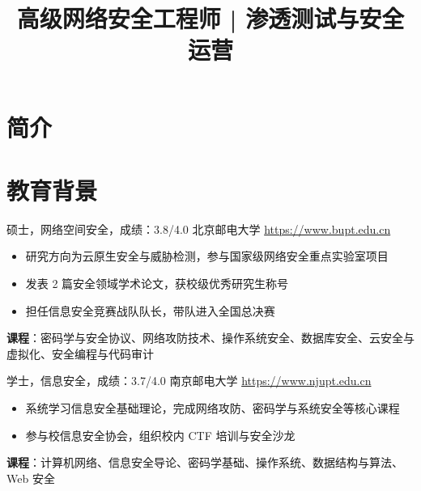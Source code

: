 \documentclass[a4paper, serif, 10pt]{moderncv}
\title{高级网络安全工程师 | 渗透测试与安全运营}
\begin{document}
\maketitle

\section{简介}

\section{教育背景}

        {硕士，网络空间安全，成绩：3.8/4.0}
        {北京邮电大学}
        {\url{https://www.bupt.edu.cn}}
        {}
        {\begin{itemize}
\item 研究方向为云原生安全与威胁检测，参与国家级网络安全重点实验室项目
\item 发表 2 篇安全领域学术论文，获校级优秀研究生称号
\item 担任信息安全竞赛战队队长，带队进入全国总决赛
\end{itemize}
\textbf{课程}：密码学与安全协议、网络攻防技术、操作系统安全、数据库安全、云安全与虚拟化、安全编程与代码审计}

        {学士，信息安全，成绩：3.7/4.0}
        {南京邮电大学}
        {\url{https://www.njupt.edu.cn}}
        {}
        {\begin{itemize}
\item 系统学习信息安全基础理论，完成网络攻防、密码学与系统安全等核心课程
\item 参与校信息安全协会，组织校内 CTF 培训与安全沙龙
\end{itemize}
\textbf{课程}：计算机网络、信息安全导论、密码学基础、操作系统、数据结构与算法、Web 安全}
\end{document}

